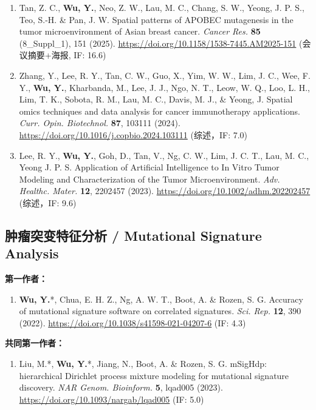 \documentclass[11pt,a4paper]{article}
\newcommand{\urltext}[1]{\href{#1}{#1}}
\begin{document}
\begin{enumerate}[leftmargin=*,nosep,resume]
\item Tan, Z. C., \textbf{Wu, Y.}, Neo, Z. W., Lau, M. C., Chang, S. W., Yeong, J. P. S., Teo, S.-H. \& Pan, J. W. Spatial patterns of APOBEC mutagenesis in the tumor microenvironment of Asian breast cancer. \textit{Cancer Res.} \textbf{85} (8\_Suppl\_1), 151 (2025). \urltext{https://doi.org/10.1158/1538-7445.AM2025-151} (会议摘要+海报, IF: 16.6)

\item Zhang, Y., Lee, R. Y., Tan, C. W., Guo, X., Yim, W. W., Lim, J. C., Wee, F. Y., \textbf{Wu, Y.}, Kharbanda, M., Lee, J. J., Ngo, N. T., Leow, W. Q., Loo, L. H., Lim, T. K., Sobota, R. M., Lau, M. C., Davis, M. J., \& Yeong, J. Spatial omics techniques and data analysis for cancer immunotherapy applications. \textit{Curr. Opin. Biotechnol.} \textbf{87}, 103111 (2024). \urltext{https://doi.org/10.1016/j.copbio.2024.103111} (综述，IF: 7.0)

\item Lee, R. Y., \textbf{Wu, Y.}, Goh, D., Tan, V., Ng, C. W., Lim, J. C. T., Lau, M. C., Yeong J. P. S. Application of Artificial Intelligence to In Vitro Tumor Modeling and Characterization of the Tumor Microenvironment. \textit{Adv. Healthc. Mater.} \textbf{12}, 2202457 (2023). \urltext{https://doi.org/10.1002/adhm.202202457} (综述，IF: 9.6)
\end{enumerate}

\subsection*{肿瘤突变特征分析 / Mutational Signature Analysis}

\textbf{第一作者：}

\begin{enumerate}[leftmargin=*,nosep,resume]
\item \textbf{Wu, Y.}*, Chua, E. H. Z., Ng, A. W. T., Boot, A. \& Rozen, S. G. Accuracy of mutational signature software on correlated signatures. \textit{Sci. Rep.} \textbf{12}, 390 (2022). \urltext{https://doi.org/10.1038/s41598-021-04207-6} (IF: 4.3)
\end{enumerate}

\textbf{共同第一作者：}

\begin{enumerate}[leftmargin=*,nosep,resume]
\item Liu, M.*, \textbf{Wu, Y.}*, Jiang, N., Boot, A. \& Rozen, S. G. mSigHdp: hierarchical Dirichlet process mixture modeling for mutational signature discovery. \textit{NAR Genom. Bioinform.} \textbf{5}, lqad005 (2023). \urltext{https://doi.org/10.1093/nargab/lqad005} (IF: 5.0)
\end{enumerate}
\end{document}
